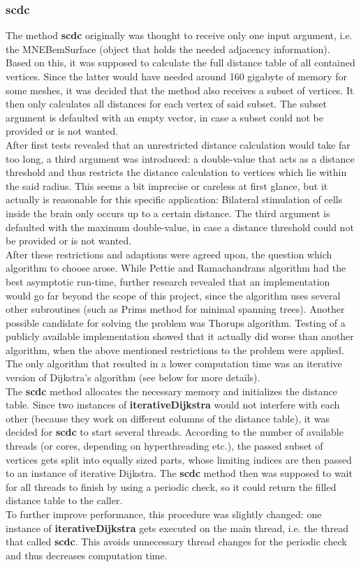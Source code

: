 \subsubsection{scdc}
The method \textbf{scdc} originally was thought to receive only one input argument, i.e. the MNEBemSurface (object that holds the needed adjacency information). Based on this, it was supposed to calculate the full distance table of all contained vertices. Since the latter would have needed around 160 gigabyte of memory for some meshes, it was decided that the method also receives a subset of vertices. It then only calculates all distances for each vertex of said subset. The subset argument is defaulted with an empty vector, in case a subset could not be provided or is not wanted.\\
After first tests revealed that an unrestricted distance calculation would take far too long, a third argument was introduced: a double-value that acts as a distance threshold and thus restricts the distance calculation to vertices which lie within the said radius. This seems a bit imprecise or careless at first glance, but it actually is reasonable for this specific application: Bilateral stimulation of cells inside the brain only occurs up to a certain distance. The third argument is defaulted with the maximum double-value, in case a distance threshold could not be provided or is not wanted.\\
After these restrictions and adaptions were agreed upon, the question which algorithm to choose arose.
While Pettie and Ramachandrans algorithm had the best asymptotic run-time, further research revealed that an implementation would go far beyond the scope of this project, since the algorithm uses several other subroutines (such as Prims method for minimal spanning trees). Another possible candidate for solving the problem was Thorups algorithm. Testing of a publicly available implementation showed that it actually did worse than another algorithm, when the above mentioned restrictions to the problem were applied. The only algorithm that resulted in a lower computation time was an iterative version of Dijkstra's algorithm (see below for more details).\\
The \textbf{scdc} method allocates the necessary memory and initializes the distance table.
Since two instances of \textbf{iterativeDijkstra} would not interfere with each other (because they work on different columns of the distance table), it was decided for \textbf{scdc} to start several threads. According to the number of available threads (or cores, depending on hyperthreading etc.), the passed subset of vertices gets split into equally sized parts, whose limiting indices are then passed to an instance of iterative Dijkstra. The \textbf{scdc} method then was supposed to wait for all threads to finish by using a periodic check, so it could return the filled distance table to the caller.\\
To further improve performance, this procedure was slightly changed: one instance of \textbf{iterativeDijkstra} gets executed on the main thread, i.e. the thread that called \textbf{scdc}. This avoids unnecessary thread changes for the periodic check and thus decreases computation time.


